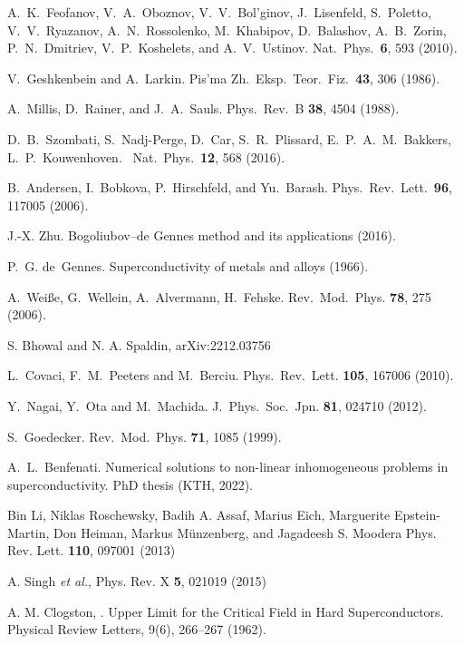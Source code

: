 \documentclass[aps,twocolumn,amsmath,amssymb,preprintnumbers,floatfix,prl,superscriptaddress,longbibliography]{revtex4-2}%
\newcommand{\etal}{\emph{et al.}}
\begin{document}
\begin{thebibliography}{999}
	A.~K.~Feofanov, V.~A.~Oboznov, V.~V.~Bol’ginov, J.~Lisenfeld, S.~Poletto, V.~V.~Ryazanov, A.~N.~Rossolenko, M.~Khabipov, D.~Balashov, A.~B.~Zorin, P.~N.~Dmitriev, V.~P.~Koshelets, and A.~V.~Ustinov.
	Nat.~Phys.~\textbf{6}, 593 (2010).

	V.~Geshkenbein and A.~Larkin.
	Pis'ma Zh.~Eksp.~Teor.~Fiz.~\textbf{43}, 306 (1986).

	A.~Millis, D.~Rainer, and J.~A.~Sauls.
	Phys.~Rev.~B \textbf{38}, 4504 (1988).

	D.~B.~Szombati, S.~Nadj-Perge, D.~Car, S.~R.~Plissard, E.~P.~A.~M.~Bakkers, L.~P.~Kouwenhoven.~
	Nat.~Phys.~\textbf{12}, 568 (2016).

	B.~Andersen, I.~Bobkova, P.~Hirschfeld, and Yu.~Barash.
	Phys.~Rev.~Lett.~\textbf{96}, 117005 (2006).

	J.-X. Zhu.
	Bogoliubov–de Gennes method and its applications (2016).

	P.~G. de~Gennes.
	Superconductivity of metals and alloys (1966).

	A.~Weiße, G.~Wellein, A.~Alvermann, H.~Fehske.
	Rev.~Mod.~Phys. \textbf{78}, 275 (2006).

  S. Bhowal and N. A. Spaldin, arXiv:2212.03756
 

	L.~Covaci, F.~M.~Peeters and M.~Berciu.
	Phys.~Rev.~Lett. \textbf{105}, 167006 (2010).

	Y.~Nagai, Y.~Ota and M.~Machida.
	J.~Phys.~Soc.~Jpn. \textbf{81}, 024710 (2012).

	S.~Goedecker.
	Rev.~Mod.~Phys. \textbf{71}, 1085 (1999).

	A.~L.~Benfenati.
	Numerical solutions to non-linear inhomogeneous problems in superconductivity.
	PhD thesis (KTH, 2022).

 Bin Li, Niklas Roschewsky, Badih A. Assaf, Marius Eich, Marguerite Epstein-Martin, Don Heiman, Markus Münzenberg, and Jagadeesh S. Moodera
Phys. Rev. Lett. \textbf{110}, 097001 (2013)

 A. Singh \etal, Phys. Rev. X \textbf{5}, 021019 (2015)

 A. M. Clogston,  . Upper Limit for the Critical Field in Hard Superconductors. Physical Review Letters, 9(6), 266–267 (1962).


\end{thebibliography}
\end{document}
